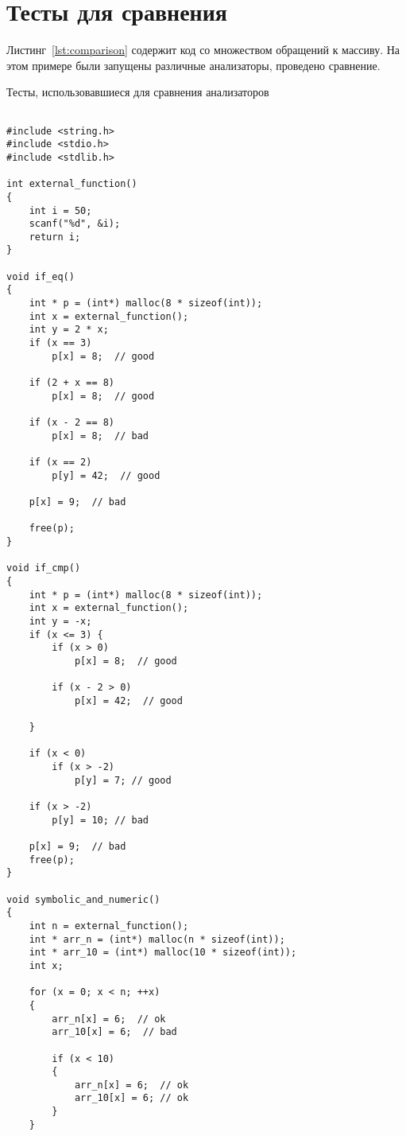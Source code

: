 \chapter{Тесты для сравнения}

Листинг~\ref{lst:comparison} содержит код со множеством обращений к
массиву. На этом примере были запущены различные анализаторы,
проведено сравнение.

\begin{algorithm}[!h]
\caption{Тесты, использовавшиеся для сравнения анализаторов}\label{lst:comparison}
\begin{lstlisting}

#include <string.h>
#include <stdio.h>
#include <stdlib.h>

int external_function()
{
    int i = 50;
    scanf("%d", &i);
    return i;
}

void if_eq()
{
    int * p = (int*) malloc(8 * sizeof(int));
    int x = external_function();
    int y = 2 * x;
    if (x == 3)
        p[x] = 8;  // good

    if (2 + x == 8)
        p[x] = 8;  // good

    if (x - 2 == 8)
        p[x] = 8;  // bad

    if (x == 2)
        p[y] = 42;  // good

    p[x] = 9;  // bad

    free(p);
}

void if_cmp()
{
    int * p = (int*) malloc(8 * sizeof(int));
    int x = external_function();
    int y = -x;
    if (x <= 3) {
        if (x > 0)
            p[x] = 8;  // good

        if (x - 2 > 0)
            p[x] = 42;  // good

    }

    if (x < 0)
        if (x > -2)
            p[y] = 7; // good

    if (x > -2)
        p[y] = 10; // bad

    p[x] = 9;  // bad
    free(p);
}

void symbolic_and_numeric()
{
    int n = external_function();
    int * arr_n = (int*) malloc(n * sizeof(int));
    int * arr_10 = (int*) malloc(10 * sizeof(int));
    int x;

    for (x = 0; x < n; ++x)
    {
        arr_n[x] = 6;  // ok
        arr_10[x] = 6;  // bad

        if (x < 10)
        {
            arr_n[x] = 6;  // ok
            arr_10[x] = 6; // ok
        }
    }


\end{lstlisting}
\end{algorithm}
